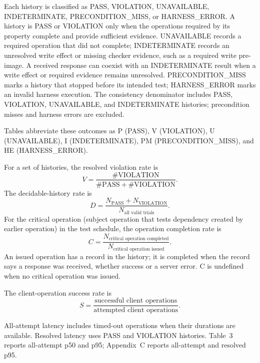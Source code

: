 Each history is classified as PASS, VIOLATION, UNAVAILABLE, INDETERMINATE,
PRECONDITION\_MISS, or HARNESS\_ERROR. A history is PASS or VIOLATION only
when the operations required by its property complete and provide sufficient
evidence. UNAVAILABLE records a required operation that did not complete;
INDETERMINATE records an unresolved write effect or missing checker evidence,
such as a required write pre-image. A received response can coexist with an
INDETERMINATE result when a write effect or required evidence remains
unresolved. PRECONDITION\_MISS
marks a history that stopped before its intended test; HARNESS\_ERROR marks an
invalid harness execution. The consistency denominator includes PASS,
VIOLATION, UNAVAILABLE, and INDETERMINATE histories; precondition misses and
harness errors are excluded.

Tables abbreviate these outcomes as P (PASS), V (VIOLATION), U (UNAVAILABLE),
I (INDETERMINATE), PM (PRECONDITION\_MISS), and HE (HARNESS\_ERROR).

For a set of histories, the resolved violation rate is
\[
V=\frac{\#\mathrm{VIOLATION}}
        {\#\mathrm{PASS}+\#\mathrm{VIOLATION}}.
\]
The decidable-history rate is
\[
D=\frac{N_{\mathrm{PASS}}+N_{\mathrm{VIOLATION}}}
        {N_{\text{all valid trials}}}.
\]
For the critical operation (subject operation that tests dependency created by earlier operation) in the test schedule, the operation completion rate is
\[
C=\frac{N_{\text{critical operation completed}}}
        {N_{\text{critical operation issued}}}.
\]
An issued operation has a record in the history; it is completed when the
record says a response was received, whether success or a server error. C is
undefined when no critical operation was issued.

The client-operation success rate is
\[
S=\frac{\text{successful client operations}}
        {\text{attempted client operations}}.
\]

All-attempt latency includes timed-out operations when their durations are
available. Resolved latency uses PASS and VIOLATION histories. Table~3 reports
all-attempt p50 and p95; Appendix~C reports all-attempt and resolved p95.
